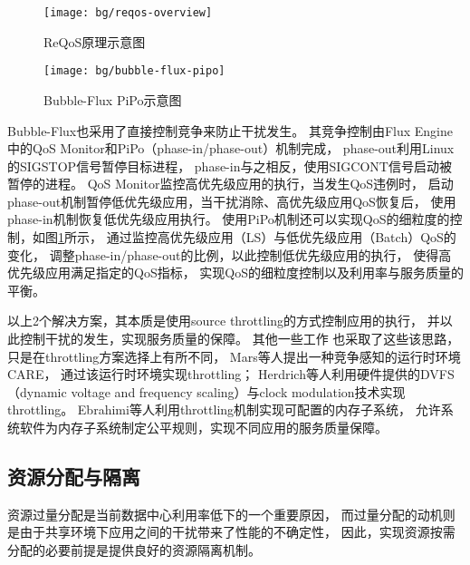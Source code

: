 \begin{figure}[tb]
\begin{minipage}[b]{0.42\textwidth}
  \centering
  \texttt{[image: bg/reqos-overview]}
  \caption{ReQoS原理示意图\cite{tang_reqos:_2013}}
  \label{fig:reqos-overview}
\end{minipage}\hfill
\begin{minipage}[b]{0.55\textwidth}
  \centering
  \texttt{[image: bg/bubble-flux-pipo]}
  \caption{Bubble-Flux PiPo示意图\cite{yang_bubble-flux:_2013}}
  \label{fig:bubble-flux-pipo}
\end{minipage}
\end{figure}

Bubble-Flux\cite{yang_bubble-flux:_2013}也采用了直接控制竞争来防止干扰发生。
其竞争控制由Flux Engine中的QoS Monitor和PiPo（phase-in/phase-out）机制完成，
phase-out利用Linux的SIGSTOP信号暂停目标进程，
phase-in与之相反，使用SIGCONT信号启动被暂停的进程。
QoS Monitor监控高优先级应用的执行，当发生QoS违例时，
启动phase-out机制暂停低优先级应用，当干扰消除、高优先级应用QoS恢复后，
使用phase-in机制恢复低优先级应用执行。
使用PiPo机制还可以实现QoS的细粒度的控制，如图\ref{fig:bubble-flux-pipo}所示，
通过监控高优先级应用（LS）与低优先级应用（Batch）QoS的变化，
调整phase-in/phase-out的比例，以此控制低优先级应用的执行，
使得高优先级应用满足指定的QoS指标，
实现QoS的细粒度控制以及利用率与服务质量的平衡。

以上2个解决方案，其本质是使用source throttling的方式控制应用的执行，
并以此控制干扰的发生，实现服务质量的保障。
其他一些工作\cite{mars_contention_2010, herdrich_rate-based_2009, ebrahimi:2010}
也采取了这些该思路，只是在throttling方案选择上有所不同，
Mars等人\cite{mars_contention_2010}提出一种竞争感知的运行时环境CARE，
通过该运行时环境实现throttling；
Herdrich等人\cite{herdrich_rate-based_2009}利用硬件提供的DVFS
（dynamic voltage and frequency scaling）与clock modulation技术实现throttling。
Ebrahimi等人\cite{ebrahimi:2010}利用throttling机制实现可配置的内存子系统，
允许系统软件为内存子系统制定公平规则，实现不同应用的服务质量保障。


\subsection{资源分配与隔离}

资源过量分配是当前数据中心利用率低下的一个重要原因，
而过量分配的动机则是由于共享环境下应用之间的干扰带来了性能的不确定性，
因此，实现资源按需分配的必要前提是提供良好的资源隔离机制。

